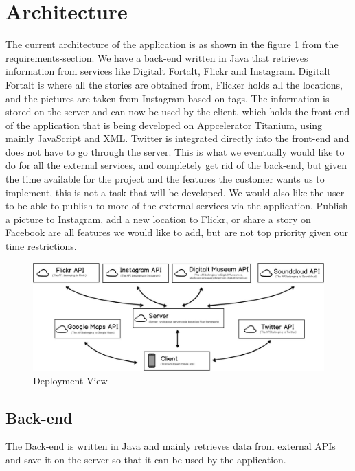 \section{Architecture}
\thispagestyle{plain}

The current architecture of the application is as shown in the figure 1 from the requirements-section. We have a back-end written in Java that retrieves information from services like Digitalt Fortalt, Flickr and Instagram. Digitalt Fortalt is where all the stories are obtained from, Flicker holds all the locations, and the pictures are taken from Instagram based on tags. The information is stored on the server and can now be used by the client, which holds the front-end of the application that is being developed on Appcelerator Titanium, using mainly JavaScript and XML. Twitter is integrated directly into the front-end and does not have to go through the server. This is what we eventually would like to do for all the external services, and completely get rid of the back-end, but given the time available for the project and the features the customer wants us to implement, this is not a task that will be developed. We would also like the user to be able to publish to more of the external services via the application. Publish a picture to Instagram, add a new location to Flickr, or share a story on Facebook are all features we would like to add, but are not top priority given our time restrictions.
\vspace{0.4in}
\begin{figure}[!h]
\begin{center}
\includegraphics[width=1\textwidth]{res/DeploymentView.jpg}
\caption{Deployment View}
\end{center}
\end{figure}


\subsection{Back-end}
The Back-end is written in Java and mainly retrieves data from external APIs and save it on the server so that it can be used by the application.


